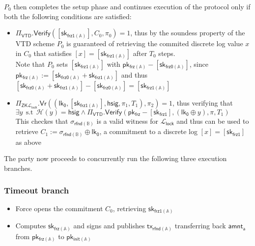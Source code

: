 \documentclass{article}      	%
\begin{document}
$P_0$ then completes the setup phase and continues execution of the protocol only if both the following conditions are satisfied: 
\begin{itemize}
\item $\Pi_{\mathsf{VTD}}.\mathsf{Verify}([\mathsf{sk_{frz1(\mathbb{A})}}], C_0, \pi_0) = 1$, thus by the soundess property of the VTD scheme $P_0$ is guaranteed of retrieving the commited discrete log value $x$ in $C_0$ that satisfies $[x] = [\mathsf{sk_{frz1(\mathbb{A})}}]$ after $T_0$ steps. \\
Note that $P_0$ sets ${[\mathsf{sk_{frz1(\mathbb{A})}}]}$ with $\mathsf{pk_{frz(\mathbb{A})}} - [\mathsf{sk_{frz0(\mathbb{A})}}]$, since $\mathsf{pk_{frz(\mathbb{A})}} := [\mathsf{sk_{frz0(\mathbb{A})}} + \mathsf{sk_{frz1(\mathbb{A})}}]$ and thus $[\mathsf{sk_{frz0(\mathbb{A})}} + \mathsf{sk_{frz1(\mathbb{A})}}] - [\mathsf{sk_{frz0(\mathbb{A})}}] = [\mathsf{sk_{frz1(\mathbb{A})}}]$
\item $\Pi_{\mathsf{ZK}\mathcal{L}_{\mathsf{lock}}}.\mathsf{Vr}((\mathsf{lk_0}, {[\mathsf{sk_{frz1(\mathbb{A})}}]}, \mathsf{hsig}, \pi_1, T_1), \pi_2) = 1$, thus verifying that 
    $\exists y \:\: \text{s.t} \:\: \mathcal{H}(y) = \mathsf{hsig} \land \Pi_\mathsf{VTD}.\mathsf{Verify}(\mathsf{pk_{frz}} - [\mathsf{sk_{frz1}}], (\mathsf{lk_0} \oplus y), \pi, T_1)$ \\
    This checkes that $\sigma_\mathsf{rfnd(\mathbb{B})}$ is a valid witness for $\mathcal{L}_{\mathsf{lock}}$ and thus can be used to retrieve $C_1 := \sigma_\mathsf{rfnd(\mathbb{B})} \oplus \mathsf{lk_0}$, a commitment to a discrete log $[x] = [\mathsf{sk_{frz1}}]$ as above
\end{itemize}

The party now proceeds to concurrently run the following three execution branches. \\

\subsubsection*{Timeout branch}
\begin{itemize}
    \item Force opens the commitment $C_0$, retrieving  $\mathsf{sk_{frz1(\mathbb{A})}}$
    \item Computes $\mathsf{sk_{frz(\mathbb{A})}}$ and signs and publishes $\mathsf{tx_{rfnd(\mathbb{A})}}$ transferring back $\mathsf{amnt_a}$ from $\mathsf{pk_{frz(\mathbb{A})}}$ to $\mathsf{pk_{init(\mathbb{A})}}$ \\
\end{itemize}
\end{document}

